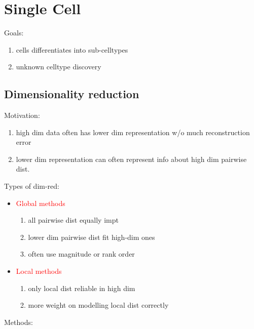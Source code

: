 \documentclass[font=12pt]{article}
\begin{document}
\newpage
\section{Single Cell}
Goals:
\begin{enumerate}
	\item cells differentiates into sub-celltypes
	\item unknown celltype discovery
\end{enumerate}

\subsection{Dimensionality reduction}
Motivation:
\begin{enumerate}
	\item high dim data often has lower dim representation w/o much reconstruction error
	\item lower dim representation can often represent info about high dim pairwise dist.
\end{enumerate}
Types of dim-red:
\begin{itemize}
	\item \textcolor{red}{Global methods}
		\begin{enumerate}
			\item all pairwise dist equally impt
			\item lower dim pairwise dist fit high-dim ones
			\item often use magnitude or rank order
		\end{enumerate}
	\item \textcolor{red}{Local methods}
		\begin{enumerate}
			\item only local dist reliable in high dim
			\item more weight on modelling local dist correctly
		\end{enumerate}
\end{itemize}
Methods:
\end{document}

